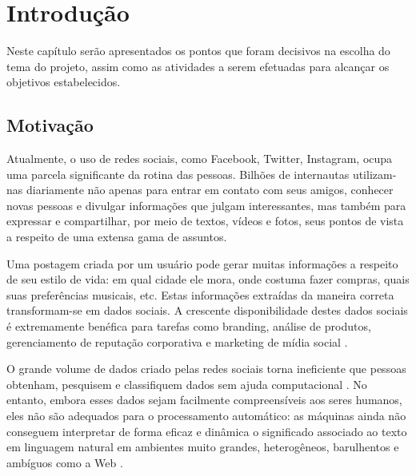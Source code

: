 \documentclass[
	12pt,				%
	openright,			%
	oneside,			%
	a4paper,			%
	english,			%
	spanish,			%
	brazil				%
	]{abntex2}
\begin{document}



 \pretextual
 

\imprimircapa

\tableofcontents*
\cleardoublepage



\printglossary[title={Lista de Siglas},type=\acronymtype] %


\textual

\chapter{Introdução}
	Neste capítulo serão apresentados os pontos que foram decisivos na escolha do tema do projeto, assim como as atividades a serem efetuadas para alcançar os objetivos estabelecidos.

	\section{Motivação}
	
	Atualmente, o uso de redes sociais, como Facebook, Twitter, Instagram, ocupa uma parcela significante da rotina das pessoas. Bilhões de internautas utilizam-nas diariamente não apenas para entrar em contato com seus amigos, conhecer novas pessoas e divulgar informações que julgam interessantes, mas também para expressar e compartilhar, por meio de textos, vídeos e fotos, seus pontos de vista a respeito de uma extensa gama de assuntos.
	
	Uma postagem criada por um usuário pode gerar muitas informações a respeito de seu estilo de vida: em qual cidade ele mora, onde costuma fazer compras, quais suas preferências musicais, etc. Estas informações extraídas da maneira correta transformam-se em dados sociais. A crescente disponibilidade destes dados sociais é extremamente benéfica para tarefas como branding, análise de produtos, gerenciamento de reputação corporativa e marketing de mídia social \cite{article_sentiment_analysis}. 
	
	O grande volume de dados criado pelas redes sociais torna ineficiente que pessoas obtenham, pesquisem e classifiquem dados sem ajuda computacional \cite{conference_fb}. No entanto, embora esses dados sejam facilmente compreensíveis aos seres humanos, eles não são adequados para o processamento automático: as máquinas ainda não conseguem interpretar de forma eficaz e dinâmica o significado associado ao texto em linguagem natural em ambientes muito grandes, heterogêneos, barulhentos e ambíguos como a Web \cite{article_sentiment_analysis}.
\end{document}
